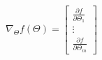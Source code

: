 \documentclass[preview]{standalone}
\begin{document}
\begin{align*}
\nabla_\Theta f(\Theta) = \begin{bmatrix} \frac{\partial f}{\partial \Theta_1} \\ \vdots \\ \frac{\partial f}{\partial \Theta_m} \end{bmatrix}
\end{align*}
\end{document}
